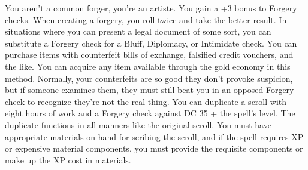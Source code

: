{You aren't a common forger, you're an \textit{}artiste.}
{You gain a +3 bonus to Forgery checks.}
{When creating a forgery, you roll twice and take the better result.}
{In situations where you can present a legal document of some sort, you can substitute a Forgery check for a Bluff, Diplomacy, or Intimidate check.}
{You can purchase items with counterfeit bills of exchange, falsified credit vouchers, and the like. You can acquire any item available through the gold economy in this method. Normally, your counterfeits are so good they don't provoke suspicion, but if someone examines them, they must still beat you in an opposed Forgery check to recognize they're not the real thing.}
{You can duplicate a scroll with eight hours of work and a Forgery check against DC 35 + the spell's level. The duplicate functions in all manners like the original scroll. You must have appropriate materials on hand for scribing the scroll, and if the spell requires XP or expensive material components, you must provide the requisite components or make up the XP cost in materials.}